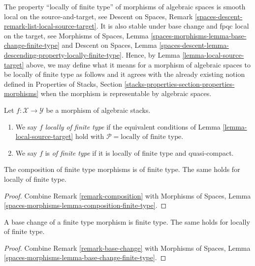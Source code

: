 \noindent
The property ``locally of finite type'' of morphisms of algebraic spaces
is smooth local on the source-and-target, see
Descent on Spaces, Remark \ref{spaces-descent-remark-list-local-source-target}.
It is also stable under base change and fpqc local on the target, see
Morphisms of Spaces,
Lemma \ref{spaces-morphisms-lemma-base-change-finite-type}
and
Descent on Spaces,
Lemma \ref{spaces-descent-lemma-descending-property-locally-finite-type}.
Hence, by
Lemma \ref{lemma-local-source-target}
above, we may define what it means for a morphism of algebraic spaces
to be locally of finite type as follows and it agrees with the already
existing notion defined in
Properties of Stacks,
Section \ref{stacks-properties-section-properties-morphisms}
when the morphism is representable by algebraic spaces.

\begin{definition}
\label{definition-locally-finite-type}
Let $f : \mathcal{X} \to \mathcal{Y}$ be a morphism of algebraic stacks.
\begin{enumerate}
\item We say $f$
{\it locally of finite type} if the equivalent conditions of
Lemma \ref{lemma-local-source-target}
hold with
$\mathcal{P} = \text{locally of finite type}$.
\item We say $f$ is
{\it of finite type} if it is locally of finite type and quasi-compact.
\end{enumerate}
\end{definition}

\begin{lemma}
\label{lemma-composition-finite-type}
The composition of finite type morphisms is of finite type.
The same holds for locally of finite type.
\end{lemma}

\begin{proof}
Combine
Remark \ref{remark-composition}
with
Morphisms of Spaces, Lemma \ref{spaces-morphisms-lemma-composition-finite-type}.
\end{proof}

\begin{lemma}
\label{lemma-base-change-finite-type}
A base change of a finite type morphism is finite type.
The same holds for locally of finite type.
\end{lemma}

\begin{proof}
Combine
Remark \ref{remark-base-change}
with
Morphisms of Spaces, Lemma \ref{spaces-morphisms-lemma-base-change-finite-type}.
\end{proof}

